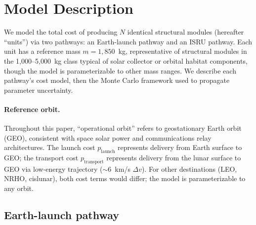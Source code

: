 \documentclass[preprint,12pt]{elsarticle}
\begin{document}
\section{Model Description}
\label{sec:model}

We model the total cost of producing $N$ identical structural modules (hereafter ``units'') via two pathways: an Earth-launch pathway and an ISRU pathway. Each unit has a reference mass $m = 1{,}850$~kg, representative of structural modules in the 1{,}000--5{,}000~kg class typical of solar collector or orbital habitat components, though the model is parameterizable to other mass ranges. We describe each pathway's cost model, then the Monte Carlo framework used to propagate parameter uncertainty.

\paragraph{Reference orbit.} Throughout this paper, ``operational orbit'' refers to geostationary Earth orbit (GEO), consistent with space solar power and communications relay architectures. The launch cost $p_{\mathrm{launch}}$ represents delivery from Earth surface to GEO; the transport cost $p_{\mathrm{transport}}$ represents delivery from the lunar surface to GEO via low-energy trajectory ($\sim$6~km/s $\Delta v$). For other destinations (LEO, NRHO, cislunar), both cost terms would differ; the model is parameterizable to any orbit.

\subsection{Earth-launch pathway}
\end{document}
